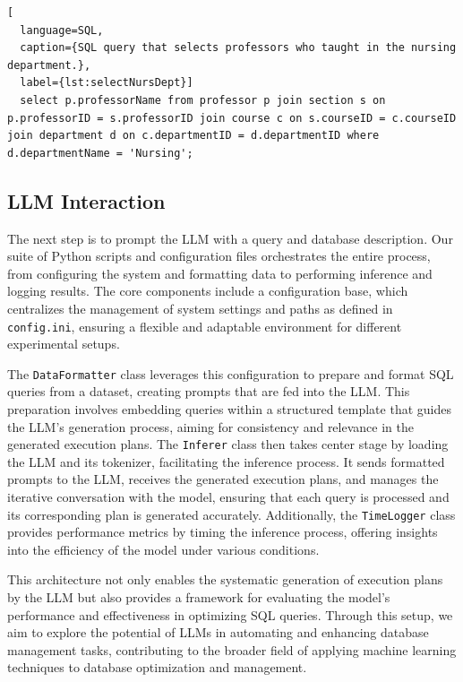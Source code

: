 \begin{lstlisting}[
  language=SQL,
  caption={SQL query that selects professors who taught in the nursing department.},
  label={lst:selectNursDept}]
  select p.professorName from professor p join section s on p.professorID = s.professorID join course c on s.courseID = c.courseID join department d on c.departmentID = d.departmentID where d.departmentName = 'Nursing';
\end{lstlisting}

\subsection*{LLM Interaction}
The next step is to prompt the LLM with a query and database description. Our suite of Python scripts and configuration files orchestrates the entire process, from configuring the system and formatting data to performing inference and logging results. The core components include a configuration base, which centralizes the management of system settings and paths as defined in \lstinline{config.ini}, ensuring a flexible and adaptable environment for different experimental setups.

The \lstinline{DataFormatter} class leverages this configuration to prepare and format SQL queries from a dataset, creating prompts that are fed into the LLM. This preparation involves embedding queries within a structured template that guides the LLM's generation process, aiming for consistency and relevance in the generated execution plans. The \lstinline{Inferer} class then takes center stage by loading the LLM and its tokenizer, facilitating the inference process. It sends formatted prompts to the LLM, receives the generated execution plans, and manages the iterative conversation with the model, ensuring that each query is processed and its corresponding plan is generated accurately. Additionally, the \lstinline{TimeLogger} class provides performance metrics by timing the inference process, offering insights into the efficiency of the model under various conditions.

This architecture not only enables the systematic generation of execution plans by the LLM but also provides a framework for evaluating the model's performance and effectiveness in optimizing SQL queries. Through this setup, we aim to explore the potential of LLMs in automating and enhancing database management tasks, contributing to the broader field of applying machine learning techniques to database optimization and management.

